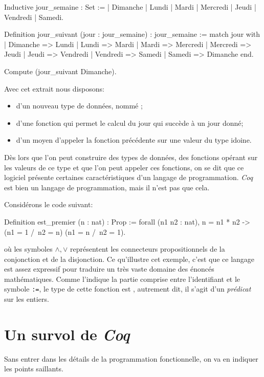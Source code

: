 \documentclass[a4paper,10pt]{article}
\begin{document}
\begin{coq}[]
Inductive jour_semaine : Set :=
  | Dimanche
  | Lundi
  | Mardi
  | Mercredi
  | Jeudi
  | Vendredi
  | Samedi.

Definition jour_suivant (jour : jour_semaine) : jour_semaine := match jour with
  | Dimanche => Lundi
  | Lundi => Mardi
  | Mardi => Mercredi
  | Mercredi => Jeudi
  | Jeudi => Vendredi
  | Vendredi => Samedi
  | Samedi => Dimanche
end.

Compute (jour_suivant Dimanche).
\end{coq}

Avec cet extrait nous disposons:
\begin{itemize}
\item d'un nouveau type de données, nommé ;
\item d'une fonction qui permet le calcul du jour qui succède à un jour donné;
\item d'un moyen d'appeler la fonction précédente sur une valeur du type idoine.
\end{itemize}

Dès lors que l'on peut construire des types de données, des fonctions opérant sur les valeurs de ce type et
que l'on peut appeler ces fonctions, on se dit que ce logiciel présente certaines caractéristiques d'un
langage de programmation.  \emph{Coq} est bien un langage de programmation, mais il n'est pas que cela.

Considérons le code suivant:

\begin{coq}[]
Definition est_premier (n : nat) : Prop :=
  forall (n1 n2 : nat), n = n1 * n2 -> (n1 = 1 /\ n2 = n) \/ (n1 = n /\ n2 = 1).
\end{coq}

où les symboles \(\wedge, \vee\) représentent les connecteurs propositionnels de la conjonction et de la
disjonction.  Ce qu'illustre cet exemple, c'est que ce langage est assez expressif pour traduire un très
vaste domaine des énoncés mathématiques.  Comme l'indique la partie comprise entre l'identifiant et le
symbole \texttt{:=}, le type de cette fonction est , autrement dit, il s'agit d'un
\emph{prédicat} sur les entiers.

\section{Un survol de \emph{Coq}}
\label{sec:org02573f6}
Sans entrer dans les détails de la programmation fonctionnelle, on va en indiquer les points saillants.
\end{document}
